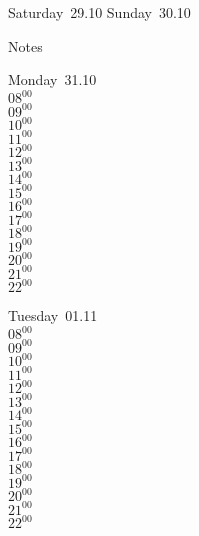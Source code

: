 \documentclass[11pt,a4paper]{book}\usepackage[]{graphicx}\usepackage[]{color}
\begin{document}
\begin{weekendbox}
  Saturday~29.10
  \tcblower
  Sunday~30.10
\end{weekendbox} %
\begin{notebox}
  Notes
\end{notebox}
\clearpage
\begin{headerbox}
\end{headerbox}
\begin{weekdaybox}
  Monday~31.10\\
  { 
  \vfill
  $08^{00}$\\
$09^{00}$\\
$10^{00}$\\
$11^{00}$\\
$12^{00}$\\
$13^{00}$\\
$14^{00}$\\
$15^{00}$\\
$16^{00}$\\
$17^{00}$\\
$18^{00}$\\
$19^{00}$\\
$20^{00}$\\
$21^{00}$\\
$22^{00}$\\
  }
\end{weekdaybox}
\begin{weekdaybox}
  Tuesday~01.11\\
  { 
  \vfill
  $08^{00}$\\
$09^{00}$\\
$10^{00}$\\
$11^{00}$\\
$12^{00}$\\
$13^{00}$\\
$14^{00}$\\
$15^{00}$\\
$16^{00}$\\
$17^{00}$\\
$18^{00}$\\
$19^{00}$\\
$20^{00}$\\
$21^{00}$\\
$22^{00}$\\
  }
\end{weekdaybox}
\end{document}
